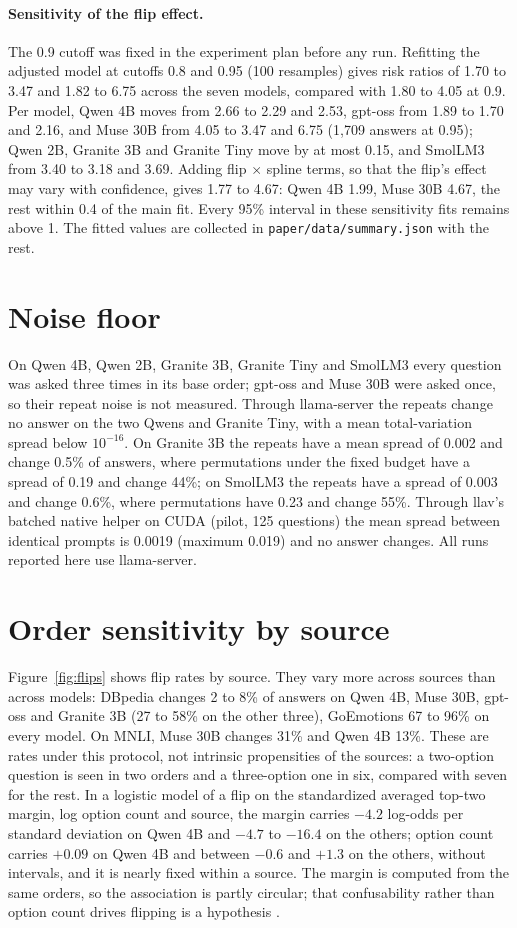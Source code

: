 \documentclass[10pt,twocolumn]{article}
\begin{document}
\paragraph{Sensitivity of the flip effect.} The 0.9 cutoff was fixed in the experiment plan before any run. Refitting the adjusted model at cutoffs 0.8 and 0.95 (100 resamples) gives risk ratios of 1.70 to 3.47 and 1.82 to 6.75 across the seven models, compared with 1.80 to 4.05 at 0.9. Per model, Qwen 4B moves from 2.66 to 2.29 and 2.53, gpt-oss from 1.89 to 1.70 and 2.16, and Muse 30B from 4.05 to 3.47 and 6.75 (1,709 answers at 0.95); Qwen 2B, Granite 3B and Granite Tiny move by at most 0.15, and SmolLM3 from 3.40 to 3.18 and 3.69. Adding flip $\times$ spline terms, so that the flip's effect may vary with confidence, gives 1.77 to 4.67: Qwen 4B 1.99, Muse 30B 4.67, the rest within 0.4 of the main fit. Every 95\% interval in these sensitivity fits remains above 1. The fitted values are collected in \texttt{paper/data/summary.json} with the rest.

\section{Noise floor}
\label{app:noise}
On Qwen 4B, Qwen 2B, Granite 3B, Granite Tiny and SmolLM3 every question was asked three times in its base order; gpt-oss and Muse 30B were asked once, so their repeat noise is not measured. Through llama-server the repeats change no answer on the two Qwens and Granite Tiny, with a mean total-variation spread below $10^{-16}$. On Granite 3B the repeats have a mean spread of 0.002 and change 0.5\% of answers, where permutations under the fixed budget have a spread of 0.19 and change 44\%; on SmolLM3 the repeats have a spread of 0.003 and change 0.6\%, where permutations have 0.23 and change 55\%. Through llav's batched native helper on CUDA (pilot, 125 questions) the mean spread between identical prompts is 0.0019 (maximum 0.019) and no answer changes. All runs reported here use llama-server.

\section{Order sensitivity by source}
\label{app:sources}
Figure~\ref{fig:flips} shows flip rates by source. They vary more across sources than across models: DBpedia changes 2 to 8\% of answers on Qwen 4B, Muse 30B, gpt-oss and Granite 3B (27 to 58\% on the other three), GoEmotions 67 to 96\% on every model. On MNLI, Muse 30B changes 31\% and Qwen 4B 13\%. These are rates under this protocol, not intrinsic propensities of the sources: a two-option question is seen in two orders and a three-option one in six, compared with seven for the rest. In a logistic model of a flip on the standardized averaged top-two margin, log option count and source, the margin carries $-4.2$ log-odds per standard deviation on Qwen 4B and $-4.7$ to $-16.4$ on the others; option count carries $+0.09$ on Qwen 4B and between $-0.6$ and $+1.3$ on the others, without intervals, and it is nearly fixed within a source. The margin is computed from the same orders, so the association is partly circular; that confusability rather than option count drives flipping is a hypothesis \citep{pezeshkpour2024order}.
\end{document}
